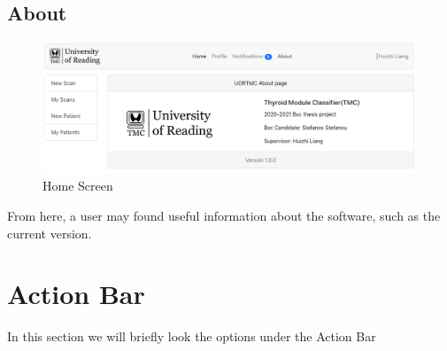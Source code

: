 		\subsection{About}
			\begin{figure}[H]
				\iftrue
				\centering
				\caption{Home Screen}
				\includegraphics[scale=0.3]{figures/about}
				\fi
			\end{figure}
			From here, a user may found useful information about the software, such as the current version.
	\section{Action Bar}
		In this section we will briefly look the options under the Action Bar
